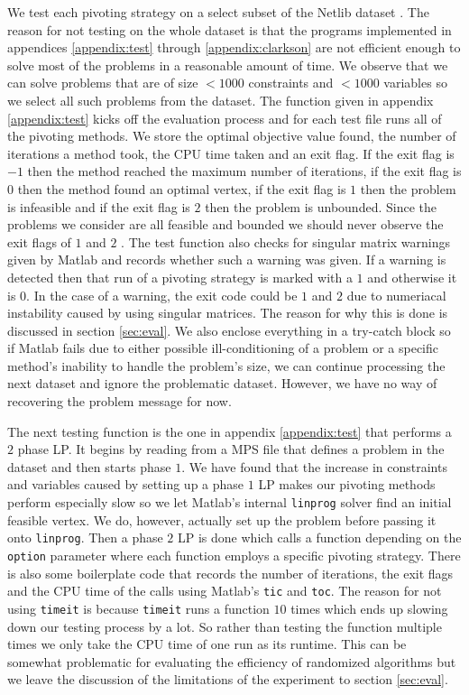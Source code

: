 \documentclass{standalone}
\begin{document}
We test each pivoting strategy on a select subset of the Netlib dataset \cite{netlibtest}. The reason for not testing on the whole dataset is that the programs implemented in appendices \ref{appendix:test} through \ref{appendix:clarkson} are not efficient enough to solve most of the problems in a reasonable amount of time. We observe that we can solve problems that are of size $<1000$ constraints and $<1000$ variables so we select all such problems from the dataset. The function given in appendix \ref{appendix:test} kicks off the evaluation process and for each test file runs all of the pivoting methods. We store the optimal objective value found, the number of iterations a method took, the CPU time taken and an exit flag. If the exit flag is $-1$ then the method reached the maximum number of iterations, if the exit flag is $0$ then the method found an optimal vertex, if the exit flag is $1$ then the problem is infeasible and if the exit flag is $2$ then the problem is unbounded. Since the problems we consider are all feasible and bounded we should never observe the exit flags of $1$ and $2$ \cite{netlibtest}. The test function also checks for singular matrix warnings given by Matlab and records whether such a warning was given. If a warning is detected then that run of a pivoting strategy is marked with a $1$ and otherwise it is $0$. In the case of a warning, the exit code could be $1$ and $2$ due to numeriacal instability caused by using singular matrices. The reason for why this is done is discussed in section \ref{sec:eval}. We also enclose everything in a try-catch block so if Matlab fails due to either possible ill-conditioning of a problem or a specific method's inability to handle the problem's size, we can continue processing the next dataset and ignore the problematic dataset. However, we have no way of recovering the problem message for now.\par
The next testing function is the one in appendix \ref{appendix:test} that performs a $2$ phase LP. It begins by reading from a MPS file that defines a problem in the dataset and then starts phase $1$. We have found that the increase in constraints and variables caused by setting up a phase $1$ LP makes our pivoting methods perform especially slow so we let Matlab's internal \verb|linprog| solver find an initial feasible vertex. We do, however, actually set up the problem before passing it onto \verb|linprog|. Then a phase $2$ LP is done which calls a function depending on the \verb|option| parameter where each function employs a specific pivoting strategy. There is also some boilerplate code that records the number of iterations, the exit flags and the CPU time of the calls using Matlab's \verb|tic| and \verb|toc|. The reason for not using \verb|timeit| is because \verb|timeit| runs a function $10$ times which ends up slowing down our testing process by a lot. So rather than testing the function multiple times we only take the CPU time of one run as its runtime. This can be somewhat problematic for evaluating the efficiency of randomized algorithms but we leave the discussion of the limitations of the experiment to section \ref{sec:eval}.\par
\end{document}
